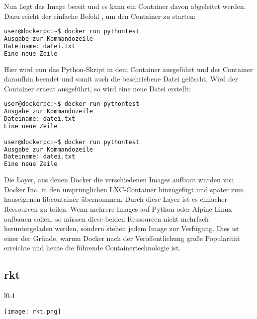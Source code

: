 Nun liegt das Image bereit und es kann ein Container davon abgeleitet werden. Dazu reicht der einfache Befehl , um den Container zu starten:

\begin{lstlisting}[language=bash,caption={Terminalausgabe docker run},label={code:dockerbuild}]
user@dockerpc:~$ docker run pythontest
Ausgabe zur Kommandozeile
Dateiname: datei.txt
Eine neue Zeile
\end{lstlisting}

Hier wird nun das Python-Skript in dem Container ausgeführt und der Container daraufhin beendet und somit auch die beschriebene Datei gelöscht. Wird der Container erneut ausgeführt, so wird eine neue Datei erstellt:

\begin{lstlisting}[language=bash,caption={Terminalausgabe docker run mehrfach},label={code:dockerbuild}]
user@dockerpc:~$ docker run pythontest
Ausgabe zur Kommandozeile
Dateiname: datei.txt
Eine neue Zeile

user@dockerpc:~$ docker run pythontest
Ausgabe zur Kommandozeile
Dateiname: datei.txt
Eine neue Zeile
\end{lstlisting}

Die Layer, aus denen Docker die verschiedenen Images aufbaut wurden von Docker Inc. in den ursprünglichen \ac{LXC}-Container hinzugefügt und später zum hauseigenen libcontainer übernommen. Durch diese Layer ist es einfacher Ressourcen zu teilen. Wenn mehrere Images auf Python oder Alpine-Linux aufbauen sollen, so müssen diese beiden Ressourcen nicht mehrfach heruntergeladen werden, sondern stehen jedem Image zur Verfügung. Dies ist einer der Gründe, warum Docker nach der Veröffentlichung große Popularität erreichte und heute die führende Containertechnologie ist. \citep{dockermilestones}



\subsection*{rkt}
\label{sec:rkt}

\begin{wrapfigure}{l}{0.4\textwidth}
	\vspace{-40pt}
	\begin{center}
		\texttt{[image: rkt.png]}
	\end{center}
	\vspace{-15pt}
	\caption[Logo rkt]{ \footnotemark}
	\label{fig:rkt}
	\vspace{-30pt}
\end{wrapfigure}


